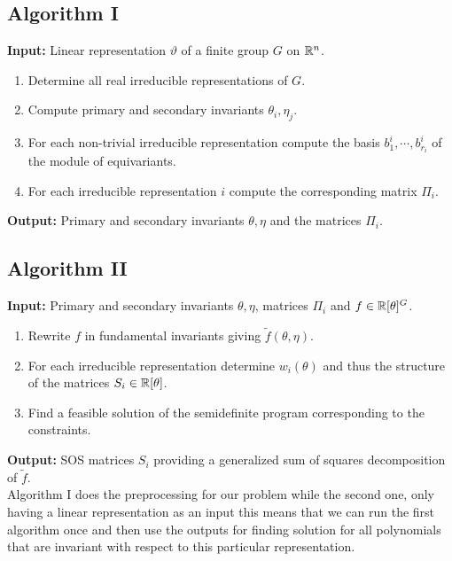 \documentclass[]{article}
\begin{document}
\subsection*{Algorithm I}


\textbf{Input:} Linear representation $\vartheta$ of a finite group $G$ on $\mathbb R^n$.

\begin{enumerate}
    \item Determine all real irreducible representations of $G$.
    \item Compute primary and secondary invariants $\theta_i,\eta_j$. 
    \item For each non-trivial irreducible representation compute the basis $b_1^i,\cdots, b_{r_i}^i$ of the module of equivariants.
    \item For each irreducible representation $i$ compute the corresponding matrix $\Pi_i$.
\end{enumerate}
\noindent
\textbf{Output:} Primary and secondary invariants $\theta,\eta$ and the matrices $\Pi_i$.

\subsection*{Algorithm II}

\textbf{Input: } Primary and secondary invariants $\theta,\eta$, matrices $\Pi_i$ and $f \in \mathbb R[\theta]^G$.

\begin{enumerate}
    \item Rewrite $f$ in fundamental invariants giving $\tilde{f}(\theta,\eta)$.
    \item For each irreducible representation determine $w_i(\theta)$ and thus the structure of the matrices $S_i\in \mathbb R[\theta]$.
    \item Find a feasible solution of the semidefinite program corresponding to the constraints.
\end{enumerate}
\noindent
\textbf{Output:} SOS matrices $S_i$ providing a generalized sum of squares decomposition of $\tilde{f}$.\\



Algorithm I does the preprocessing for our problem while the second one, only having a linear representation as an input
this means that we can run the first algorithm once and then 
use the outputs for finding solution for 
all polynomials that are invariant with respect to this particular representation.
\end{document}
